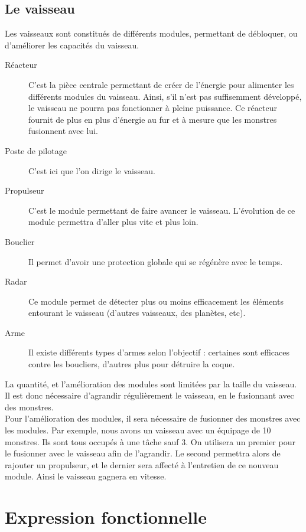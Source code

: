 \documentclass[a4paper,11pt]{report}
\begin{document}
    \section{Le vaisseau}
        Les vaisseaux sont constitués de différents modules, permettant de débloquer, ou d'améliorer les capacités du vaisseau.
        \begin{description}
            \item[Réacteur] C'est la pièce centrale permettant de créer de l'énergie pour alimenter les différents modules du vaisseau. Ainsi, s'il n'est pas suffisemment développé, le vaisseau ne pourra pas fonctionner à pleine puissance. Ce réacteur fournit de plus en plus d'énergie au fur et à mesure que les monstres fusionnent avec lui.
            \item[Poste de pilotage] C'est ici que l'on dirige le vaisseau.
            \item[Propulseur] C'est le module permettant de faire avancer le vaisseau. L'évolution de ce module permettra d'aller plus vite et plus loin.
            \item[Bouclier] Il permet d'avoir une protection globale qui se régénère avec le temps.
            \item[Radar] Ce module permet de détecter plus ou moins efficacement les éléments entourant le vaisseau (d'autres vaisseaux, des planètes, etc).
            \item[Arme] Il existe différents types d'armes selon l'objectif : certaines sont efficaces contre les boucliers, d'autres plus pour détruire la coque.
        \end{description}

        La quantité, et l'amélioration des modules sont limitées par la taille du vaisseau. Il est donc nécessaire d'agrandir régulièrement le vaisseau, en le fusionnant avec des monstres.\\

        Pour l'amélioration des modules, il sera nécessaire de fusionner des monstres avec les modules. Par exemple, nous avons un vaisseau avec un équipage de 10 monstres. Ils sont tous occupés à une tâche sauf 3. On utilisera un premier pour le fusionner avec le vaisseau afin de l'agrandir. Le second permettra alors de rajouter un propulseur, et le dernier sera affecté à l'entretien de ce nouveau module. Ainsi le vaisseau gagnera en vitesse.\\

\chapter{Expression fonctionnelle}
\end{document}
